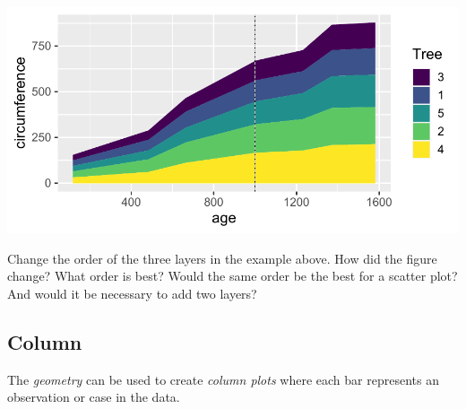 \documentclass[krantz2]{krantz}\usepackage{knitr}
\begin{document}
\begin{knitrout}\footnotesize
{}\color{fgcolor}\begin{kframe}
\begin{alltt}
\hlstd{(} 
       \hlstd{(}      \hlopt{+}
  \hlstd{(} \hlstd{=} \hlstd{)} \hlopt{+}
  \hlstd{(} \hlstd{=} \hlstd{,}  \hlstd{=} \hlstd{)} \hlopt{+}
  \hlstd{(} \hlstd{=} \hlstd{,}  \hlstd{=} \hlstd{)}
\end{alltt}
\end{kframe}

{\centering \includegraphics[width=.7\textwidth]{figure/pos-area-plot-02-1} 

}


\end{knitrout}

\begin{playground}
  Change the order of the three layers in the example above. How did the figure change? What order is best? Would the same order be the best for a scatter plot? And would it be necessary to add two  layers?
\end{playground}

\subsection{Column}\label{sec:plot:col}

The \emph{geometry}  can be used to create \emph{column plots} where each bar represents an observation or case in the data.
\end{document}
